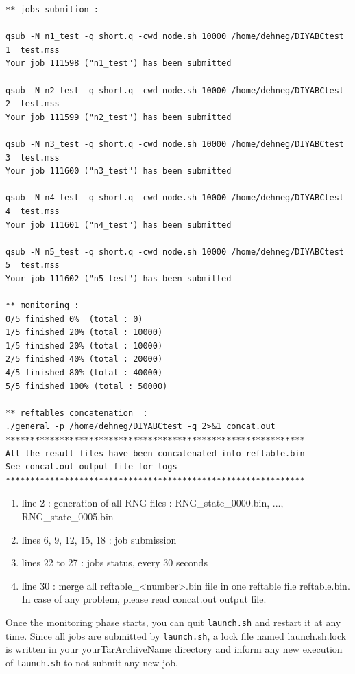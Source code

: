 \begin{minipage}{0.9\textwidth}
\begin{lstlisting}
** jobs submition :

qsub -N n1_test -q short.q -cwd node.sh 10000 /home/dehneg/DIYABCtest 1  test.mss
Your job 111598 ("n1_test") has been submitted

qsub -N n2_test -q short.q -cwd node.sh 10000 /home/dehneg/DIYABCtest 2  test.mss
Your job 111599 ("n2_test") has been submitted

qsub -N n3_test -q short.q -cwd node.sh 10000 /home/dehneg/DIYABCtest 3  test.mss
Your job 111600 ("n3_test") has been submitted

qsub -N n4_test -q short.q -cwd node.sh 10000 /home/dehneg/DIYABCtest 4  test.mss
Your job 111601 ("n4_test") has been submitted

qsub -N n5_test -q short.q -cwd node.sh 10000 /home/dehneg/DIYABCtest 5  test.mss
Your job 111602 ("n5_test") has been submitted

** monitoring :
0/5 finished 0%  (total : 0)
1/5 finished 20% (total : 10000)
1/5 finished 20% (total : 10000)
2/5 finished 40% (total : 20000)
4/5 finished 80% (total : 40000)
5/5 finished 100% (total : 50000)

** reftables concatenation  :
./general -p /home/dehneg/DIYABCtest -q 2>&1 concat.out
*************************************************************
All the result files have been concatenated into reftable.bin
See concat.out output file for logs
*************************************************************
\end{lstlisting}
   \end{minipage}
\begin{enumerate}
    \item line 2 : generation of all RNG files : \textsf{RNG\_state\_0000.bin}, ..., \textsf{RNG\_state\_0005.bin}
    \item lines 6, 9, 12, 15, 18 : job submission 
    \item lines 22 to 27 : jobs status, every 30 seconds
    \item line 30 : merge all \textsf{reftable\_<number>.bin} file in one reftable file \textsf{reftable.bin}. In case of any problem, please read \textsf{concat.out} output file.
\end{enumerate}
Once the monitoring phase starts, you can quit \texttt{launch.sh} and restart it at any time. Since all jobs are submitted by \texttt{launch.sh}, a lock file named launch.sh.lock is written in your yourTarArchiveName directory and inform any new execution of \texttt{launch.sh} to not submit any new job.

